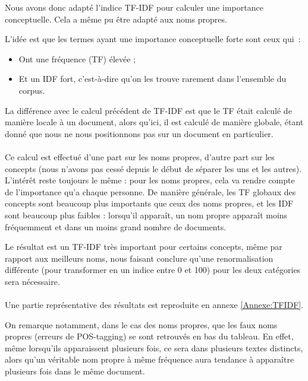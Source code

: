 \documentclass[a4paper, 12pt]{article}
\begin{document}
Nous avons donc adapté l'indice TF-IDF pour calculer une importance conceptuelle. Cela a même pu être adapté aux noms propres.

L'idée est que les termes ayant une importance conceptuelle forte sont ceux qui~:
\begin{itemize}
 \item Ont une fréquence (TF) élevée ;
 \item Et un IDF fort, c'est-à-dire qu'on les trouve rarement dans l'ensemble du corpus.
\end{itemize}

La différence avec le calcul précédent de TF-IDF est que le TF était calculé de manière locale à un document, alors qu'ici, il est calculé de manière globale, étant donné que nous ne nous positionnons pas sur un document en particulier.

\paragraph{}
Ce calcul est effectué d'une part sur les noms propres, d'autre part sur les concepts (nous n'avons pas cessé depuis le début de séparer les uns et les autres). L'intérêt reste toujours le même : pour les noms propres, cela va rendre compte de l'importance qu'a chaque personne. De manière générale, les TF globaux des concepts sont beaucoup plus importants que ceux des noms propres, et les IDF sont beaucoup plus faibles : lorsqu'il apparaît, un nom propre apparaît moins fréquemment et dans un moins grand nombre de documents.

Le résultat est un TF-IDF très important pour certains concepts, même par rapport aux meilleurs noms, nous faisant conclure qu'une renormalisation différente (pour transformer en un indice entre 0 et 100) pour les deux catégories sera nécessaire.

\paragraph{}
Une partie représentative des résultats est reproduite en annexe \ref{Annexe:TFIDF}.

On remarque notamment, dans le cas des noms propres, que les faux noms propres (erreurs de POS-tagging) se sont retrouvés en bas du tableau. En effet, même lorsqu'ils apparaissent plusieurs fois, ce sera dans plusieurs textes distincts, alors qu'un véritable nom propre à même fréquence aura tendance à apparaître plusieurs fois dans le même document.
\end{document}
